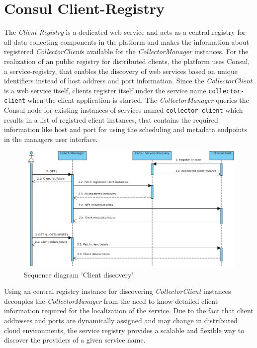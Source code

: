 \section{Consul Client-Registry}

The \textit{Client-Registry} is a dedicated web service and acts as a central registry for all data collecting components
in the platform and makes the information about registered \textit{CollectorClient}s available for the \textit{CollectorManager} instances.
For the realization of an public registry for distributed clients, the platform uses Consul, a service-registry, that enables the discovery
of web services based on unique identifiers instead of host address and port information. Since the \textit{CollectorClient} is a web service itself,
clients register itself under the service name \verb|collector-client| when the client application is started. The \textit{CollectorManager}
queries the Consul node for existing instances of services named \verb|collector-client| which results in a list of registred client instances,
that contains the required information like host and port for using the scheduling and metadata endpoints in the managers user interface.

\begin{figure}[H]
	\centering
	\includegraphics[width=1.0\textwidth]{../uml/sequence-discovery.jpg}
	\caption{Sequence diagram 'Client discovery'}
	\label{fig:sequence-client-discovery}
\end{figure}

Using an central registry instance for discovering \textit{CollectorClient} instances decouples the \textit{CollectorManager} from the
need to know detailed client information required for the localization of the service. Due to the fact that
client addresses and ports are dynamically assigned and may change in distributed cloud environments, the service registry provides
a scalable and flexible way to discover the providers of a given service name.

